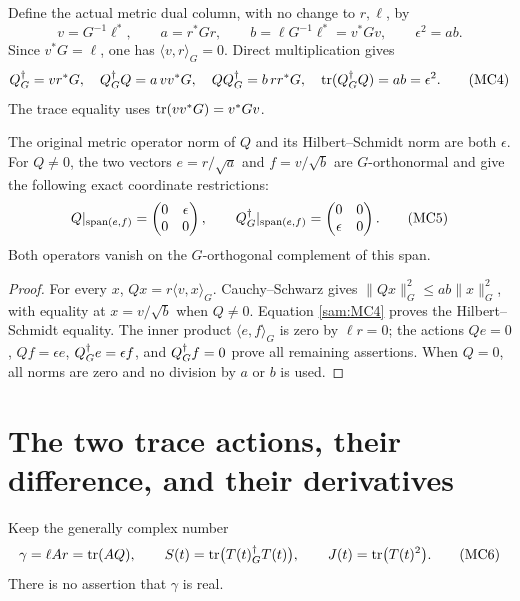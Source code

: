 \documentclass[11pt]{article}
\begin{document}
Define the actual metric dual column, with no change to \(r,\ell\), by
\begin{equation}
 v=G^{-1}\ell^*,\qquad
 a=r^*Gr,\qquad b=\ell G^{-1}\ell^*=v^*Gv,\qquad
 \epsilon^2=ab.
 \tag{MC3}\label{sam:MC3}
\end{equation}
Since \(v^*G=\ell\), one has \(\langle v,r\rangle_G=0\).
Direct multiplication gives
\begin{equation}
 Q^\dagger_G=vr^*G,\quad
 Q^\dagger_G Q=a\,vv^*G,\quad QQ^\dagger_G=b\,rr^*G,\quad
 \operatorname{tr}(Q^\dagger_G Q)=ab=\epsilon^2.
 \tag{MC4}\label{sam:MC4}
\end{equation}
The trace equality uses \(\operatorname{tr}(vv^*G)=v^*Gv\).

\begin{samlemma}
The original metric operator norm of \(Q\) and its Hilbert--Schmidt norm
are both \(\epsilon\). For \(Q\ne0\), the two vectors
\(e=r/\sqrt a\) and \(f=v/\sqrt b\) are \(G\)-orthonormal and give
the following exact coordinate restrictions:
\begin{equation}
 Q|_{\operatorname{span}(e,f)}
 =\begin{pmatrix}0&\epsilon\\0&0\end{pmatrix},\qquad
 Q^\dagger_G|_{\operatorname{span}(e,f)}
 =\begin{pmatrix}0&0\\\epsilon&0\end{pmatrix}.
 \tag{MC5}\label{sam:MC5}
\end{equation}
Both operators vanish on the \(G\)-orthogonal complement of this span.
\end{samlemma}
\begin{proof}
For every \(x\), \(Qx=r\langle v,x\rangle_G\). Cauchy--Schwarz gives
\(\|Qx\|_G^2\le ab\|x\|_G^2\), with equality at \(x=v/\sqrt b\)
when \(Q\ne0\). Equation \eqref{sam:MC4} proves the Hilbert--Schmidt equality.
The inner product \(\langle e,f\rangle_G\) is zero by \(\ell r=0\);
the actions \(Qe=0\), \(Qf=\epsilon e\), \(Q^\dagger_G e=\epsilon f\),
and \(Q^\dagger_G f=0\) prove all remaining assertions. When \(Q=0\), all
norms are zero and no division by \(a\) or \(b\) is used.
\end{proof}

\section{The two trace actions, their difference, and their derivatives}

Keep the generally complex number
\begin{equation}
 \gamma=\ell Ar=\operatorname{tr}(AQ),\qquad
 S(t)=\operatorname{tr}\bigl(T(t)^\dagger_G T(t)\bigr),\qquad
 J(t)=\operatorname{tr}\bigl(T(t)^2\bigr).
 \tag{MC6}\label{sam:MC6}
\end{equation}
There is no assertion that \(\gamma\) is real.
\end{document}
